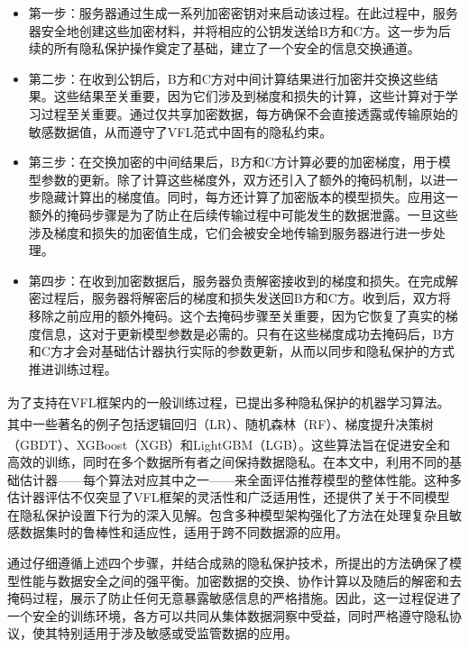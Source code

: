 \begin{itemize}
	\item 第一步：服务器通过生成一系列加密密钥对来启动该过程。在此过程中，服务器安全地创建这些加密材料，并将相应的公钥发送给B方和C方。这一步为后续的所有隐私保护操作奠定了基础，建立了一个安全的信息交换通道。
	
	\item 第二步：在收到公钥后，B方和C方对中间计算结果进行加密并交换这些结果。这些结果至关重要，因为它们涉及到梯度和损失的计算，这些计算对于学习过程至关重要。通过仅共享加密数据，每方确保不会直接透露或传输原始的敏感数据值，从而遵守了VFL范式中固有的隐私约束。
	
	\item 第三步：在交换加密的中间结果后，B方和C方计算必要的加密梯度，用于模型参数的更新。除了计算这些梯度外，双方还引入了额外的掩码机制，以进一步隐藏计算出的梯度值。同时，每方还计算了加密版本的模型损失。应用这一额外的掩码步骤是为了防止在后续传输过程中可能发生的数据泄露。一旦这些涉及梯度和损失的加密值生成，它们会被安全地传输到服务器进行进一步处理。
	
	\item 第四步：在收到加密数据后，服务器负责解密接收到的梯度和损失。在完成解密过程后，服务器将解密后的梯度和损失发送回B方和C方。收到后，双方将移除之前应用的额外掩码。这个去掩码步骤至关重要，因为它恢复了真实的梯度信息，这对于更新模型参数是必需的。只有在这些梯度成功去掩码后，B方和C方才会对基础估计器执行实际的参数更新，从而以同步和隐私保护的方式推进训练过程。
\end{itemize}

为了支持在VFL框架内的一般训练过程，已提出多种隐私保护的机器学习算法\textsuperscript{\cite{yang2019federated}}。其中一些著名的例子包括逻辑回归（LR）\textsuperscript{\cite{he2021secure,yang2019parallel}}、随机森林（RF）\textsuperscript{\cite{yao2022efficient}}、梯度提升决策树（GBDT）\textsuperscript{\cite{he2021secure}}、XGBoost（XGB）\textsuperscript{\cite{xu2021efficient,wang2022feverless}}和LightGBM（LGB）\textsuperscript{\cite{feng2019securegbm}}。这些算法旨在促进安全和高效的训练，同时在多个数据所有者之间保持数据隐私。在本文中，利用不同的基础估计器——每个算法对应其中之一——来全面评估推荐模型的整体性能。这种多估计器评估不仅突显了VFL框架的灵活性和广泛适用性，还提供了关于不同模型在隐私保护设置下行为的深入见解。包含多种模型架构强化了方法在处理复杂且敏感数据集时的鲁棒性和适应性，适用于跨不同数据源的应用。

通过仔细遵循上述四个步骤，并结合成熟的隐私保护技术，所提出的方法确保了模型性能与数据安全之间的强平衡。加密数据的交换、协作计算以及随后的解密和去掩码过程，展示了防止任何无意暴露敏感信息的严格措施。因此，这一过程促进了一个安全的训练环境，各方可以共同从集体数据洞察中受益，同时严格遵守隐私协议，使其特别适用于涉及敏感或受监管数据的应用。 

